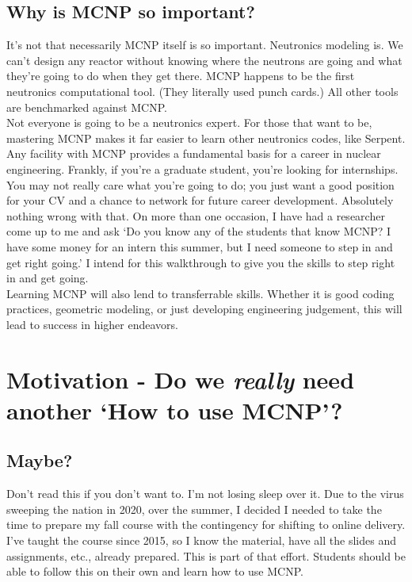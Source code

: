 \documentclass[11pt,a4paper]{article}
\begin{document}
\subsection{Why is MCNP so important?}
\noindent It's not that necessarily MCNP itself is so important. Neutronics modeling is. We can't design any reactor without knowing where the neutrons are going and what they're going to do when they get there. MCNP happens to be the first neutronics computational tool. (They literally used punch cards.) All other tools are benchmarked against MCNP.\\

\noindent Not everyone is going to be a neutronics expert. For those that want to be, mastering MCNP makes it far easier to learn other neutronics codes, like Serpent. Any facility with MCNP provides a fundamental basis for a career in nuclear engineering. Frankly, if you're a graduate student, you're looking for internships. You may not really care what you're going to do; you just want a good position for your CV and a chance to network for future career development. Absolutely nothing wrong with that. On more than one occasion, I have had a researcher come up to me and ask `Do you know any of the students that know MCNP? I have some money for an intern this summer, but I need someone to step in and get right going.' I intend for this walkthrough to give you the skills to step right in and get going.\\

\noindent Learning MCNP will also lend to transferrable skills. Whether it is good coding practices, geometric modeling, or just developing engineering judgement, this will lead to success in higher endeavors. \\

\newpage


\section{Motivation - Do we \textit{really }need another `How to use MCNP'?} \label{motivation}
\subsection{Maybe?}
\noindent Don't read this if you don't want to. I'm not losing sleep over it. Due to the virus sweeping the nation in 2020, over the summer, I decided I needed to take the time to prepare my fall course with the contingency for shifting to online delivery. I've taught the course since 2015, so I know the material, have all the slides and assignments, etc., already prepared. This is part of that effort. Students should be able to follow this on their own and learn how to use MCNP. 
\end{document}
